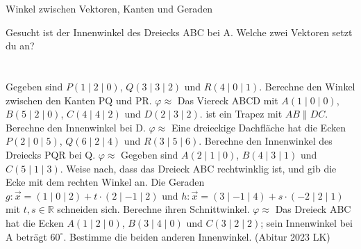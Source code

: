 \begin{aufgabe}{Winkel zwischen Vektoren, Kanten und Geraden}
\begin{teile}
\teil Gesucht ist der Innenwinkel des Dreiecks ABC bei A. Welche zwei Vektoren setzt du an? \\  \\  \\ 
\teil Gegeben sind $P(1 \mid 2 \mid 0)$, $Q(3 \mid 3 \mid 2)$ und $R(4 \mid 0 \mid 1)$. Berechne den Winkel zwischen den Kanten PQ und PR. $\varphi \approx$ \leerfeld[$^\circ$]
\teil Das Viereck ABCD mit $A(1 \mid 0 \mid 0)$, $B(5 \mid 2 \mid 0)$, $C(4 \mid 4 \mid 2)$ und $D(2 \mid 3 \mid 2)$. ist ein Trapez mit $AB \parallel DC$. Berechne den Innenwinkel bei D. $\varphi \approx$ \leerfeld[$^\circ$]
\teil Eine dreieckige Dachfläche hat die Ecken $P(2 \mid 0 \mid 5)$, $Q(6 \mid 2 \mid 4)$ und $R(3 \mid 5 \mid 6)$. Berechne den Innenwinkel des Dreiecks PQR bei Q. $\varphi \approx$ \leerfeld[$^\circ$]
\teil Gegeben sind $A(2 \mid 1 \mid 0)$, $B(4 \mid 3 \mid 1)$ und $C(5 \mid 1 \mid 3)$. Weise nach, dass das Dreieck ABC rechtwinklig ist, und gib die Ecke mit dem rechten Winkel an.
\teil Die Geraden $g\colon \vec x = (1 \mid 0 \mid 2) + t \cdot (2 \mid -1 \mid 2)$ und $h\colon \vec x = (3 \mid -1 \mid 4) + s \cdot (-2 \mid 2 \mid 1)$ mit $t, s \in \mathbb{R}$ schneiden sich. Berechne ihren Schnittwinkel. $\varphi \approx$ \leerfeld[$^\circ$]
\teil Das Dreieck ABC hat die Ecken $A(1 \mid 2 \mid 0)$, $B(3 \mid 4 \mid 0)$ und $C(3 \mid 2 \mid 2)$; sein Innenwinkel bei A beträgt $60^\circ$. Bestimme die beiden anderen Innenwinkel. \hfill (Abitur 2023 LK)
\end{teile}
\end{aufgabe}

